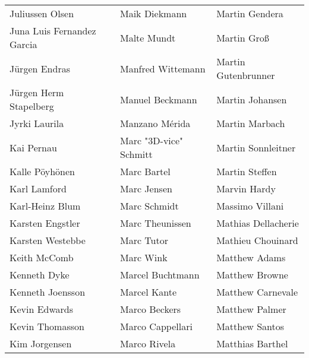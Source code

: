 \begin{tabular}{p{4.5cm}p{4.5cm}p{4.5cm}}
Juliussen Olsen & Maik Diekmann & Martin Gendera \\
Juna Luis Fernandez Garcia & Malte Mundt & Martin Groß \\
Jürgen Endras & Manfred Wittemann & Martin Gutenbrunner \\
Jürgen Herm Stapelberg & Manuel Beckmann & Martin Johansen \\
Jyrki Laurila & Manzano Mérida & Martin Marbach \\
Kai Pernau & Marc "3D-vice" Schmitt & Martin Sonnleitner \\
Kalle Pöyhönen & Marc Bartel & Martin Steffen \\
Karl Lamford & Marc Jensen & Marvin Hardy \\
Karl-Heinz Blum & Marc Schmidt & Massimo Villani \\
Karsten Engstler & Marc Theunissen & Mathias Dellacherie \\
Karsten Westebbe & Marc Tutor & Mathieu Chouinard \\
Keith McComb & Marc Wink & Matthew Adams \\
Kenneth Dyke & Marcel Buchtmann & Matthew Browne \\
Kenneth Joensson & Marcel Kante & Matthew Carnevale \\
Kevin Edwards & Marco Beckers & Matthew Palmer \\
Kevin Thomasson & Marco Cappellari & Matthew Santos \\
Kim Jorgensen & Marco Rivela & Matthias Barthel \\
\end{tabular}
\newpage
\setlength{\tabcolsep}{1mm}
